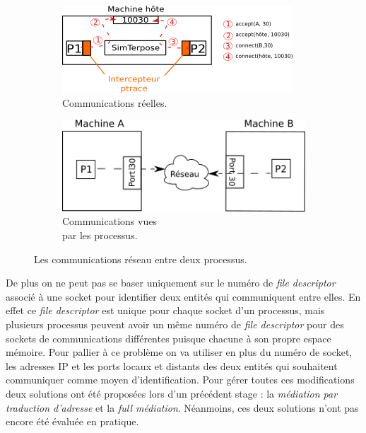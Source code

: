 \begin{figure}[H]
  \centering
  \begin{subfigure}{0.5\textwidth}
    \includegraphics[scale=0.8]{Pictures/png/Mediation_realite}
    \caption{Communications réelles.}
  \label{COMM_REALITE}
  \end{subfigure}
  \begin{subfigure}{0.25\textwidth}
  \includegraphics[scale=0.5]{Pictures/png/Mediation_VM}
  \caption{Communications vues \\ par les processus.}
  \label{COMM_VM}
  \end{subfigure}
  \caption{Les communications réseau entre deux processus.}
  \label{COMM}
\end{figure}

De plus on ne peut pas se baser uniquement sur le numéro de \textit{file
  descriptor} associé à une socket pour identifier deux entités qui communiquent
entre elles. En effet ce \textit{file descriptor} est unique pour chaque socket
d'un processus, mais plusieurs processus peuvent avoir un même numéro de
\textit{file descriptor} pour des sockets de communications différentes puisque
chacune à son propre espace mémoire. Pour pallier à ce problème on va utiliser
en plus du numéro de socket, les adresses IP et les ports locaux et distants des
deux entités qui souhaitent communiquer comme moyen d'identification. Pour gérer
toutes ces modifications deux solutions ont été proposées lors d'un précédent
stage \citep{GUILLAUME:Interceptionsyscall}: la \textit{médiation par traduction
  d'adresse} et la \textit{full médiation}. Néanmoins, ces deux solutions n'ont
pas encore été évaluée en pratique.

